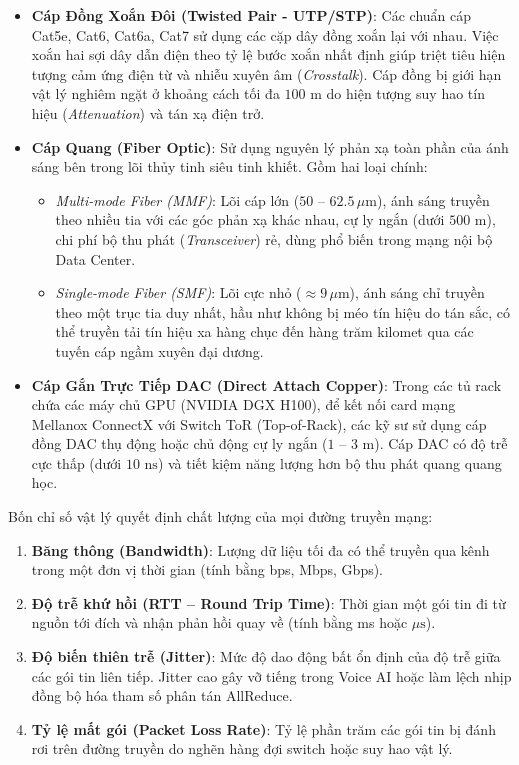 \begin{itemize}
  \item \textbf{Cáp Đồng Xoắn Đôi (Twisted Pair - UTP/STP)}: Các chuẩn cáp Cat5e, Cat6, Cat6a, Cat7 sử dụng các cặp dây đồng xoắn lại với nhau. Việc xoắn hai sợi dây dẫn điện theo tỷ lệ bước xoắn nhất định giúp triệt tiêu hiện tượng cảm ứng điện từ và nhiễu xuyên âm (\textit{Crosstalk}). Cáp đồng bị giới hạn vật lý nghiêm ngặt ở khoảng cách tối đa $100\text{ m}$ do hiện tượng suy hao tín hiệu (\textit{Attenuation}) và tán xạ điện trở.
  \item \textbf{Cáp Quang (Fiber Optic)}: Sử dụng nguyên lý phản xạ toàn phần của ánh sáng bên trong lõi thủy tinh siêu tinh khiết. Gồm hai loại chính:
    \begin{itemize}
      \item \textit{Multi-mode Fiber (MMF)}: Lõi cáp lớn ($50\text{ -- }62.5\,\mu\text{m}$), ánh sáng truyền theo nhiều tia với các góc phản xạ khác nhau, cự ly ngắn (dưới $500\text{ m}$), chi phí bộ thu phát (\textit{Transceiver}) rẻ, dùng phổ biến trong mạng nội bộ Data Center.
      \item \textit{Single-mode Fiber (SMF)}: Lõi cực nhỏ ($\approx 9\,\mu\text{m}$), ánh sáng chỉ truyền theo một trục tia duy nhất, hầu như không bị méo tín hiệu do tán sắc, có thể truyền tải tín hiệu xa hàng chục đến hàng trăm kilomet qua các tuyến cáp ngầm xuyên đại dương.
    \end{itemize}
  \item \textbf{Cáp Gắn Trực Tiếp DAC (Direct Attach Copper)}: Trong các tủ rack chứa các máy chủ GPU (NVIDIA DGX H100), để kết nối card mạng Mellanox ConnectX với Switch ToR (Top-of-Rack), các kỹ sư sử dụng cáp đồng DAC thụ động hoặc chủ động cự ly ngắn ($1\text{ -- }3\text{ m}$). Cáp DAC có độ trễ cực thấp (dưới $10\text{ ns}$) và tiết kiệm năng lượng hơn bộ thu phát quang quang học.
\end{itemize}

Bốn chỉ số vật lý quyết định chất lượng của mọi đường truyền mạng:
\begin{enumerate}
  \item \textbf{Băng thông (Bandwidth)}: Lượng dữ liệu tối đa có thể truyền qua kênh trong một đơn vị thời gian (tính bằng bps, Mbps, Gbps).
  \item \textbf{Độ trễ khứ hồi (RTT -- Round Trip Time)}: Thời gian một gói tin đi từ nguồn tới đích và nhận phản hồi quay về (tính bằng ms hoặc $\mu\text{s}$).
  \item \textbf{Độ biến thiên trễ (Jitter)}: Mức độ dao động bất ổn định của độ trễ giữa các gói tin liên tiếp. Jitter cao gây vỡ tiếng trong Voice AI hoặc làm lệch nhịp đồng bộ hóa tham số phân tán AllReduce.
  \item \textbf{Tỷ lệ mất gói (Packet Loss Rate)}: Tỷ lệ phần trăm các gói tin bị đánh rơi trên đường truyền do nghẽn hàng đợi switch hoặc suy hao vật lý.
\end{enumerate}

